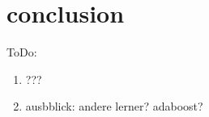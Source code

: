 \chapter{conclusion}\label{cconclusion}

ToDo:
\begin{enumerate}[nosep]
    \item ???
    \item ausbblick: andere lerner? adaboost?
\end{enumerate}

